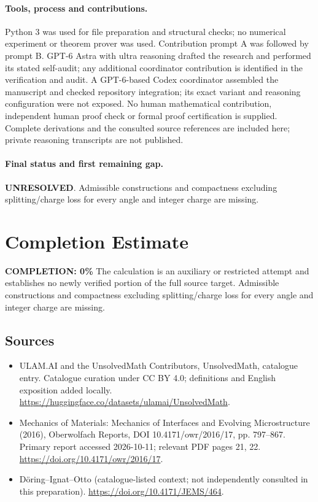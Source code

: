 \documentclass[11pt]{article}
\begin{document}
\paragraph{Tools, process and contributions.}
Python 3 was used for file preparation and structural checks; no numerical experiment or theorem prover was used. Contribution prompt A was followed by prompt B. GPT-6 Astra with ultra reasoning drafted the research and performed its stated self-audit; any additional coordinator contribution is identified in the verification and audit. A GPT-6-based Codex coordinator assembled the manuscript and checked repository integration; its exact variant and reasoning configuration were not exposed. No human mathematical contribution, independent human proof check or formal proof certification is supplied. Complete derivations and the consulted source references are included here; private reasoning transcripts are not published.

\paragraph{Final status and first remaining gap.}
\textbf{UNRESOLVED}. Admissible constructions and compactness excluding splitting/charge loss for every angle and integer charge are missing.

\section{Completion Estimate}
\noindent\textbf{COMPLETION: 0\%}
The calculation is an auxiliary or restricted attempt and establishes no newly verified portion of the full source target. Admissible constructions and compactness excluding splitting/charge loss for every angle and integer charge are missing.

\subsection{Sources}
\begin{itemize}
\item[\hypertarget{source:statement:1}{S1}] ULAM.AI and the UnsolvedMath Contributors, UnsolvedMath, catalogue entry. Catalogue curation under CC BY 4.0; definitions and English exposition added locally.
\url{https://huggingface.co/datasets/ulamai/UnsolvedMath}.
\item[\hypertarget{source:statement:2}{S2}] Mechanics of Materials: Mechanics of Interfaces and Evolving Microstructure (2016), Oberwolfach Reports, DOI 10.4171/owr/2016/17, pp. 797--867. Primary report accessed 2026-10-11; relevant PDF pages 21, 22.
\url{https://doi.org/10.4171/owr/2016/17}.
\item[\hypertarget{source:statement:3}{S3}] Döring--Ignat--Otto (catalogue-listed context; not independently consulted in this preparation).
\url{https://doi.org/10.4171/JEMS/464}.
\end{itemize}
\label{end:statement}
\end{document}
